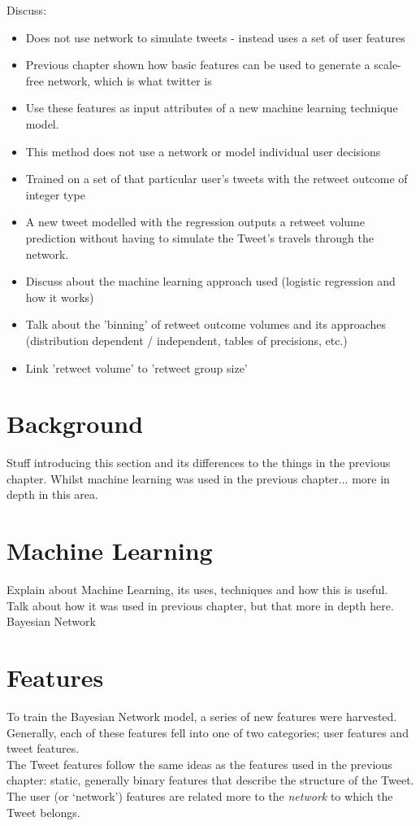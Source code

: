 Discuss:
\begin{itemize}
\item Does not use network to simulate tweets - instead uses a set of user features
\item Previous chapter shown how basic features can be used to generate a scale-free network, which is what twitter is
\item Use these features as input attributes of a new machine learning technique model.
\item This method does not use a network or model individual user decisions
\item Trained on a set of that particular user's tweets with the retweet outcome of integer type
\item A new tweet modelled with the regression outputs a retweet volume prediction without having to simulate the Tweet's travels through the network. 
\item Discuss about the machine learning approach used (logistic regression and how it works)
\item Talk about the 'binning' of retweet outcome volumes and its approaches (distribution dependent / independent, tables of precisions, etc.)
\item Link 'retweet volume' to 'retweet group size'
\end{itemize}

\section{Background}
Stuff introducing this section and its differences to the things in the previous chapter.
Whilst machine learning was used in the previous chapter... more in depth in this area.

\section{Machine Learning}
Explain about Machine Learning, its uses, techniques and how this is useful.
\\
Talk about how it was used in previous chapter, but that more in depth here.
Bayesian Network



\section{Features}
To train the Bayesian Network model, a series of new features were harvested. Generally, each of these features fell into one of two categories; user features and tweet features.
\\
The Tweet features follow the same ideas as the features used in the previous chapter: static, generally binary features that describe the structure of the Tweet. The user (or `network')  features are related more to the \emph{network} to which the Tweet belongs.

